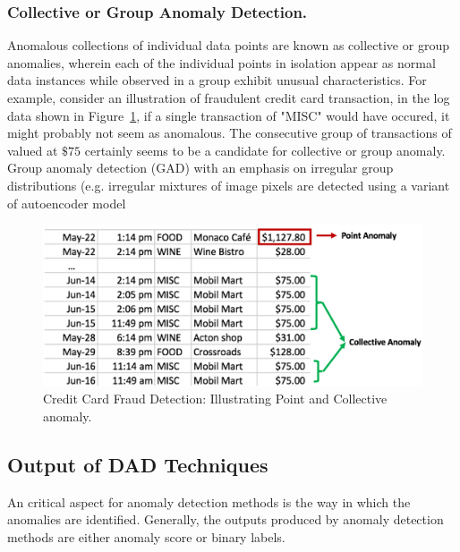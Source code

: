 \subsubsection{Collective or Group Anomaly Detection.}
Anomalous collections of individual data points are known as collective or group anomalies, wherein each of the individual points in isolation appear as normal data instances while observed in a group exhibit unusual characteristics. For example, consider an illustration of fraudulent credit card transaction, in the log data shown in Figure~\ref{fig:PointAndCollectiveAnomaly}, if a single transaction of "MISC" would have occured, it might probably not seem as anomalous. The consecutive group of transactions of valued at $\$75$ certainly seems to be a candidate for collective or group anomaly.
Group anomaly detection (GAD) with an emphasis on irregular group distributions (e.g. irregular mixtures of image pixels are detected using a variant of autoencoder model~\cite{chalapathy2018group,bontemps2016collective,araya2016collective,zhuang2017group}
\begin{figure}[h]
\centering
\includegraphics[scale=0.5]{images/PointAndCollectiveAnomaly}
\captionsetup{justification=centering}
\caption{Credit Card Fraud Detection: Illustrating Point and Collective anomaly.}
\label{fig:PointAndCollectiveAnomaly}
\end{figure}



\subsection {Output of DAD Techniques}
\label{output_of_dad_methods}
An critical aspect for anomaly detection methods is the way in which the anomalies are identified. Generally, the outputs produced by anomaly detection methods are either anomaly score or binary labels.

